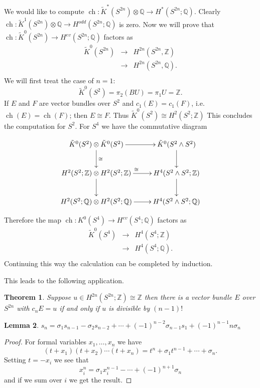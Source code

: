 \documentclass[a4paper,10pt]{article}
\theoremstyle{plain}%
\newtheorem{thm}{Theorem}
\newtheorem{lem}[thm]{Lemma}
\theoremstyle{definition}
\theoremstyle{remark}
\newcommand{\ZZ}{\mathbb{Z}}
\newcommand{\QQ}{\mathbb{Q}}
\DeclareMathOperator{\ch}{ch}
\begin{document}
We would like to compute $\ch:\tilde{K}^*(S^{2n})\otimes \QQ\to H^*(S^{2n};\QQ)$. Clearly $\ch:\tilde{K}^1(S^{2n})\otimes \QQ\to H^{odd}(S^{2n};\QQ)$ is zero. Now we will prove that $\ch:\tilde{K}^0(S^{2n})\to H^{ev}(S^{2n};\QQ)$ factors as 
\[\begin{array}{rcl}
\tilde{K}^0(S^{2n})&\to& H^{2n}(S^{2n},\ZZ)\\
				   &\to& H^{2n}(S^{2n},\QQ).\\
\end{array}
\]
We will first treat the case of $n=1$:\\ 
\[
\tilde{K}^0(S^2) = \pi_2(BU)=\pi_1U =\ZZ.
\]
If $E$ and $F$ are vector bundles over $S^2$ and $c_1(E) = c_1(F)$, i.e. $\ch(E) = \ch(F)$; then $E\cong F$. Thus $\tilde{K}^0(S^2)\cong H^2(S^2;\ZZ)$ This concludes the computation for $S^2$.
For $S^4$ we have the commutative diagram

\begin{displaymath}
    \xymatrix{
        \tilde{K}^0(S^2)\otimes \tilde{K}^0(S^2) \ar[r] \ar[d]^{\cong} & \tilde{K}^0(S^2\wedge S^2) \ar[d] \\
        H^2(S^2;\ZZ)\otimes H^2(S^2;\ZZ) \ar[r]^{\cong} \ar[d]      & H^4(S^2\wedge S^2;\ZZ) \ar[d] \\
		H^2(S^2;\QQ)\otimes H^2(S^2;\QQ) \ar[r]    & H^4(S^2\wedge S^2;\QQ)
        }
\end{displaymath}

Therefore the map $\ch:K^0(S^{4})\to H^{ev}(S^4;\QQ)$ factors as 
\[\begin{array}{rcl}
\tilde{K}^0(S^{4})&\to& H^{4}(S^{4};\ZZ)\\
				   &\to& H^{4}(S^{4};\QQ).\\
\end{array}
\] Continuing this way the calculation can be completed by induction.

This leads to the following application.
\begin{thm}
Suppose $u\in H^{2n}(S^{2n};\ZZ)\cong\ZZ$ then there is a vector bundle $E$ over $S^{2n}$ with $c_nE = u$ if and only if $u$ is divisible by $(n-1)!$
\end{thm}

\begin{lem}
$s_n = \sigma_1 s_{n-1}-\sigma_2s_{n-2}+\cdots+(-1)^{n-2}\sigma_{n-1}s_1+(-1)^{n-1}n\sigma_n$
\end{lem}

\begin{proof}
For formal variables $x_1,\ldots, x_n$ we have
\[
(t+x_1)(t+x_2)\cdots(t+x_n) = t^n + \sigma_1t^{n-1} + \cdots + \sigma_n.
\]
Setting $t=-x_i$ we see that
\[
x_i^n = \sigma_1 x_i^{n-1}-\cdots+(-1)^{n+1}\sigma_n
\]
and if we sum over $i$ we get the result.
\end{proof}
\end{document}
